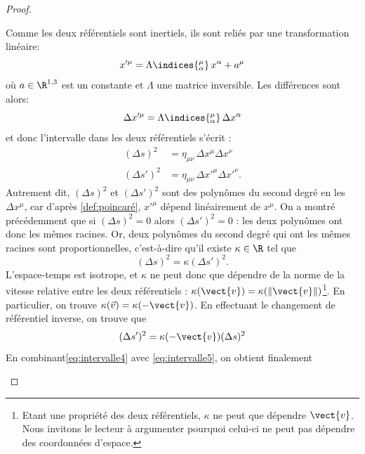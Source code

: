 \begin{proof}
\begin{enumerate}
        Comme les deux référentiels sont inertiels, ils sont reliés par une transformation linéaire: 
        \begin{equation}
            x'^{\mu} = \Lambda\indices{^\mu_\alpha} \, x^{\alpha} + a^{\mu}
            \label{def:poincaré}
        \end{equation}
        où $a\in \R^{1,3}$ est un constante et $\Lambda$ une matrice inversible. Les différences sont alors:
        \begin{equation}
            \label{eq:intervalle1}
            \Delta x'^{\mu} = \Lambda\indices{^{\mu}_{\alpha}} \,  \Delta x^{\alpha}
        \end{equation}
        et donc l'intervalle dans les deux référentiels s'écrit : 
        \begin{align}
            \label{eq:intervalle2}
            (\Delta s)^2 & = \eta _{\mu \nu} \, \Delta x^{\mu} \Delta x^{\nu}\\
            \label{eq:intervalle3}
            (\Delta s')^2 & = \eta _{\mu \nu} \, \Delta x'^{\mu} \Delta x'^{\nu}.
        \end{align}
        Autrement dit, $(\Delta s)^2$ et $(\Delta s')^2$ sont des polynômes du second degré en les $\Delta x^{\mu}$, car d'après \ref{def:poincaré}, $x'^\mu$ dépend linéairement de $x^\mu$. On a montré précédemment que si $(\Delta s)^2 = 0$ alors $(\Delta s')^2 = 0$ : les deux polynômes ont donc les mêmes racines. Or, deux polynômes du second degré qui ont les mêmes racines sont proportionnelles, c'est-à-dire qu'il existe $\kappa\in \R$ tel que
        \begin{equation} 
            \label{eq:intervalle4}
            (\Delta s)^2 = \kappa (\Delta s')^2.
        \end{equation}
        L'espace-temps est isotrope, et $\kappa$ ne peut donc que dépendre de la norme de la vitesse relative entre les deux référentiels : $\kappa(\vect{v})=\kappa(\lVert \vect{v} \rVert)$\footnote{Etant une propriété des deux référentiels, $\kappa$ ne peut que dépendre $\vect{v}$. Nous invitons le lecteur à argumenter pourquoi celui-ci ne peut pas dépendre des coordonnées d'espace.}. En particulier, on trouve $\kappa(\Vec{v}) = \kappa(-\vect{v})$. En effectuant le changement de référentiel inverse, on trouve que
        \begin{equation}
            (\Delta s')^2 = \kappa(-\vect{v}) (\Delta s)^2
            \label{eq:intervalle5}
        \end{equation}
        En combinant\ref{eq:intervalle4} avec \ref{eq:intervalle5}, on obtient finalement

\end{enumerate}
\end{proof}
